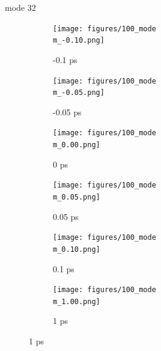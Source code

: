 \documentclass{beamer}
\newcommand\w{0.32}
\begin{document}
\renewcommand\m{32}
\begin{frame}{mode \m}
	\begin{figure}
		\centering
		\begin{subfigure}[b]{\w\textwidth}
			\centering
			\texttt{[image: figures/100\_mode\\m\_-0.10.png]}
			\caption{-0.1 ps}
		\end{subfigure}
		\begin{subfigure}[b]{\w\textwidth}
			\centering
			\texttt{[image: figures/100\_mode\\m\_-0.05.png]}
			\caption{-0.05 ps}
		\end{subfigure}
		\begin{subfigure}[b]{\w\textwidth}
			\centering
			\texttt{[image: figures/100\_mode\\m\_0.00.png]}
			\caption{0 ps}
		\end{subfigure}
		\begin{subfigure}[b]{\w\textwidth}
			\centering
			\texttt{[image: figures/100\_mode\\m\_0.05.png]}
			\caption{0.05 ps}
		\end{subfigure}
		\begin{subfigure}[b]{\w\textwidth}
			\centering
			\texttt{[image: figures/100\_mode\\m\_0.10.png]}
			\caption{0.1 ps}
		\end{subfigure}
		\begin{subfigure}[b]{\w\textwidth}
			\centering
			\texttt{[image: figures/100\_mode\\m\_1.00.png]}
			\caption{1 ps}
		\end{subfigure}
	\end{figure}
\end{frame}
\end{document}

